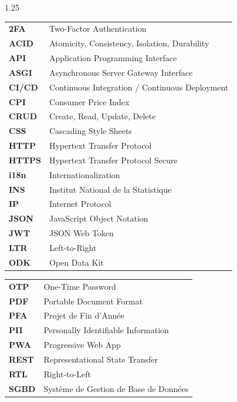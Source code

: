 \documentclass[12pt,a4paper]{report}
\begin{document}
\vspace{0.4cm}
\begin{spacing}{1.25}
\noindent
\begin{minipage}[t]{0.48\textwidth}
\begin{tabular}{p{2.0cm} p{5.0cm}}
\textbf{2FA} & Two-Factor Authentication \\
\textbf{ACID} & Atomicity, Consistency, Isolation, Durability \\
\textbf{API} & Application Programming Interface \\
\textbf{ASGI} & Asynchronous Server Gateway Interface \\
\textbf{CI/CD} & Continuous Integration / Continuous Deployment \\
\textbf{CPI} & Consumer Price Index \\
\textbf{CRUD} & Create, Read, Update, Delete \\
\textbf{CSS} & Cascading Style Sheets \\
\textbf{HTTP} & Hypertext Transfer Protocol \\
\textbf{HTTPS} & Hypertext Transfer Protocol Secure \\
\textbf{i18n} & Internationalization \\
\textbf{INS} & Institut National de la Statistique \\
\textbf{IP} & Internet Protocol \\
\textbf{JSON} & JavaScript Object Notation \\
\textbf{JWT} & JSON Web Token \\
\textbf{LTR} & Left-to-Right \\
\textbf{ODK} & Open Data Kit \\
\end{tabular}
\end{minipage}
\hfill
\begin{minipage}[t]{0.48\textwidth}
\begin{tabular}{p{2.0cm} p{5.0cm}}
\textbf{OTP} & One-Time Password \\
\textbf{PDF} & Portable Document Format \\
\textbf{PFA} & Projet de Fin d'Année \\
\textbf{PII} & Personally Identifiable Information \\
\textbf{PWA} & Progressive Web App \\
\textbf{REST} & Representational State Transfer \\
\textbf{RTL} & Right-to-Left \\
\textbf{SGBD} & Système de Gestion de Base de Données \\

\end{tabular}
\end{minipage}
\end{spacing}
\end{document}
